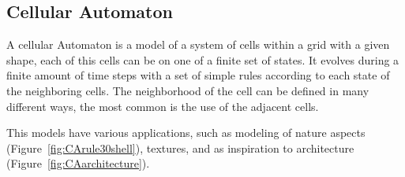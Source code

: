 
\subsection{Cellular Automaton} %
\label{sub:cellular_automaton}

A cellular Automaton is a model of a system of cells within a grid with a given shape, each of this cells can be on one of a finite set of states. It evolves during a finite amount of time steps with a set of simple rules according to each state of the neighboring cells.
The neighborhood of the cell can be defined in many different ways, the most common is the use of the adjacent cells. 

This models have various applications, such as modeling of nature aspects (Figure~\ref{fig:CArule30shell}), textures, and as inspiration to architecture (Figure~\ref{fig:CAarchitecture}).

